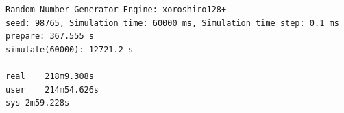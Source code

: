 \documentclass[11pt]{scrartcl}
\begin{document}
\begin{verbatim}
Random Number Generator Engine: xoroshiro128+
seed: 98765, Simulation time: 60000 ms, Simulation time step: 0.1 ms
prepare: 367.555 s
simulate(60000): 12721.2 s

real	218m9.308s
user	214m54.626s
sys	2m59.228s
\end{verbatim}


\begin{figure}
  \newline
  \subfloat[$dt=1$ ms]{
}
\end{figure}
\end{document}
